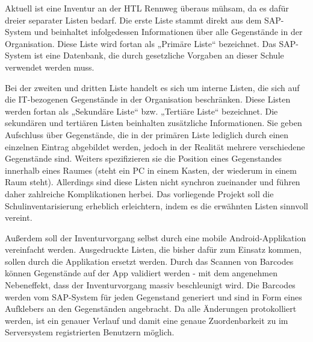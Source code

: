 Aktuell ist eine Inventur an der HTL Rennweg überaus mühsam, da es dafür dreier separater Listen bedarf. Die erste Liste stammt
direkt aus dem SAP-System und beinhaltet infolgedessen Informationen über alle Gegenstände in der Organisation. Diese Liste wird fortan als 
„Primäre Liste“ bezeichnet. Das SAP-System ist eine Datenbank, 
die durch gesetzliche Vorgaben an dieser Schule verwendet werden muss. 

Bei der zweiten und dritten Liste handelt es sich um interne Listen, die sich auf die IT-bezogenen Gegenstände in der Organisation beschränken. 
Diese Listen werden fortan als „Sekundäre Liste“ bzw. „Tertiäre Liste“ bezeichnet. Die sekundären und tertiären Listen beinhalten zusätzliche Informationen. Sie geben \zB Aufschluss über Gegenstände, die in der primären Liste lediglich durch einen einzelnen Eintrag abgebildet werden, jedoch in der Realität mehrere verschiedene Gegenstände sind. Weiters spezifizieren sie die Position eines Gegenstandes innerhalb eines Raumes (\zB steht ein PC in einem Kasten, der wiederum in einem Raum steht).
Allerdings sind diese Listen nicht synchron zueinander und führen daher zahlreiche Komplikationen herbei. 
Das vorliegende Projekt soll die Schulinventarisierung erheblich erleichtern, indem es die erwähnten Listen sinnvoll vereint. 

Außerdem soll der Inventurvorgang selbst durch eine mobile Android-Applikation vereinfacht werden. Ausgedruckte Listen, die bisher dafür zum Einsatz 
kommen, sollen durch die Applikation ersetzt werden. Durch das Scannen von Barcodes
können Gegenstände auf der App validiert werden - mit dem angenehmen Nebeneffekt, dass der Inventurvorgang massiv beschleunigt wird. Die Barcodes werden vom SAP-System für jeden Gegenstand generiert 
und sind in Form eines Aufklebers an den Gegenständen angebracht. 
Da alle Änderungen protokolliert werden, ist ein genauer Verlauf und damit eine 
genaue Zuordenbarkeit zu im Serversystem registrierten Benutzern möglich.